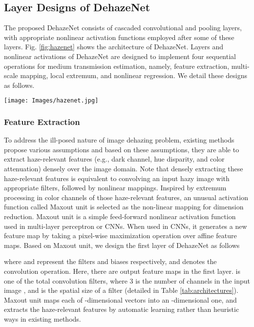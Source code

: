 \documentclass[journal]{IEEEtran}
\begin{document}
\subsection{Layer Designs of DehazeNet}
The proposed DehazeNet consists of cascaded convolutional and pooling layers, with appropriate nonlinear activation functions employed after some of these layers. Fig. \ref{fig:hazenet} shows the architecture of DehazeNet. Layers and nonlinear activations of DehazeNet are designed to implement four sequential operations for medium transmission estimation, namely, feature extraction, multi-scale mapping, local extremum, and nonlinear regression. We detail these designs as follows.
\begin{figure*}[!t]
\centering
\texttt{[image: Images/hazenet.jpg]}
\caption{The architecture of DehazeNet. DehazeNet conceptually consists of four sequential operations (feature extraction, multi-scale mapping, local extremum and non-linear regression), which is constructed by 3 convolution layers, a max-pooling, a Maxout unit and a BReLU activation function.}
\label{fig:hazenet}
\end{figure*}

\subsubsection{Feature Extraction}
To address the ill-posed nature of image dehazing problem, existing methods propose  various assumptions and based on these assumptions, they are able to extract haze-relevant features (e.g., dark channel, hue disparity, and color attenuation) densely over the image domain. Note that densely extracting these haze-relevant features is equivalent to convolving an input hazy image with appropriate filters, followed by nonlinear mappings. Inspired by extremum processing in color channels of those haze-relevant features, an unusual activation function called Maxout unit \cite{maxout} is selected as the non-linear mapping for dimension reduction. Maxout unit is a simple feed-forward nonlinear activation function used in multi-layer perceptron or CNNs. When used in CNNs, it generates a new feature map by taking a pixel-wise maximization operation over  affine feature maps. Based on Maxout unit, we design the first layer of DehazeNet as follows

where  and  represent the filters and biases respectively, and  denotes the convolution operation. Here, there are  output feature maps in the first layer.  is one of the total  convolution filters, where 3 is the number of channels in the input image , and  is the spatial size of a filter (detailed in Table \ref{tab:architectures}). Maxout unit maps each of -dimensional vectors into an -dimensional one, and extracts the haze-relevant features by automatic learning rather than heuristic ways in existing methods.
\end{document}
